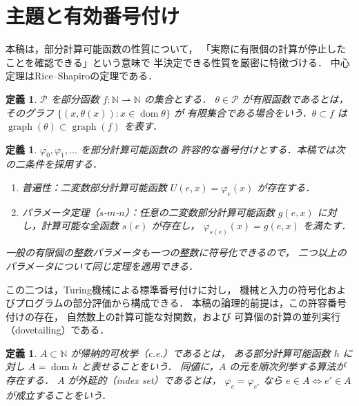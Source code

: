 \documentclass[a5paper,10pt,onecolumn]{jsarticle}
\theoremstyle{mathnotetheorem}
\newtheorem{definition}[theorem]{定義}
\begin{document}
\section{主題と有効番号付け}
本稿は，部分計算可能函数の性質について，
「実際に有限個の計算が停止したことを確認できる」という意味で
半決定できる性質を厳密に特徴づける．
中心定理はRice--Shapiroの定理である．

\begin{definition}
$\mathcal P$ を部分函数 $f:\mathbb N\rightharpoonup\mathbb N$ の集合とする．
$\theta\in\mathcal P$ が\emph{有限函数}であるとは，
そのグラフ $\{(x,\theta(x)):x\in\operatorname{dom}\theta\}$ が
有限集合である場合をいう．$\theta\subset f$ は
$\operatorname{graph}(\theta)\subset\operatorname{graph}(f)$ を表す．
\end{definition}

\begin{definition}
$\varphi_0,\varphi_1,\ldots$ を部分計算可能函数の
\emph{許容的な番号付け}とする．本稿では次の二条件を採用する．
\begin{enumerate}
\item \emph{普遍性}：二変数部分計算可能函数
$U(e,x)=\varphi_e(x)$ が存在する．
\item \emph{パラメータ定理（$s$-$m$-$n$）}：任意の二変数部分計算可能函数
$g(e,x)$ に対し，計算可能な全函数 $s(e)$ が存在し，
$\varphi_{s(e)}(x)=g(e,x)$ を満たす．
\end{enumerate}
一般の有限個の整数パラメータも一つの整数に符号化できるので，
二つ以上のパラメータについて同じ定理を適用できる．
\end{definition}

この二つは，Turing機械による標準番号付けに対し，
機械と入力の符号化およびプログラムの部分評価から構成できる．
本稿の論理的前提は，この許容番号付けの存在，
自然数上の計算可能な対関数，および
可算個の計算の並列実行（dovetailing）である．

\begin{definition}
$A\subset\mathbb N$ が\emph{帰納的可枚挙}（c.e.）であるとは，
ある部分計算可能函数 $h$ に対し
$A=\operatorname{dom}h$ と表せることをいう．
同値に，$A$ の元を順次列挙する算法が存在する．
$A$ が\emph{外延的}（index set）であるとは，
$\varphi_e=\varphi_{e'}$ なら
$e\in A\Longleftrightarrow e'\in A$ が成立することをいう．
\end{definition}
\end{document}
